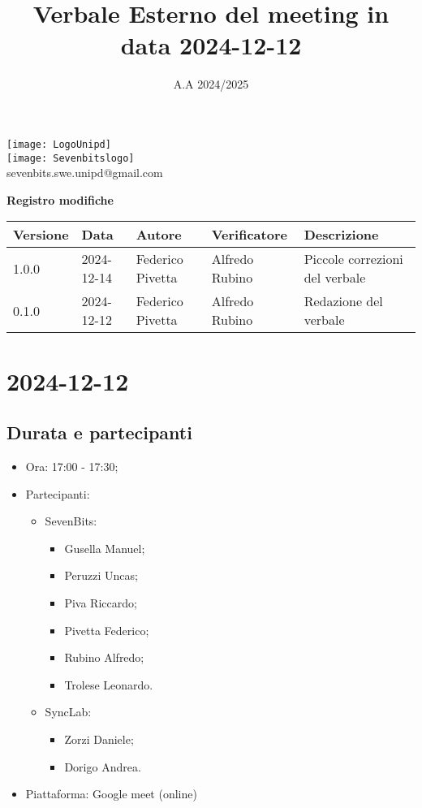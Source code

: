 \documentclass[10pt]{article}
\title{Verbale Esterno del meeting in data 2024-12-12}
\date{A.A 2024/2025}
\begin{document}
\maketitle
\begin{center}
\texttt{[image: LogoUnipd]}\\
\texttt{[image: Sevenbitslogo]}\\
sevenbits.swe.unipd@gmail.com\\
\vspace{2mm}

\textbf{Registro modifiche}\\
\vspace{2mm}
\begin{tabularx}{\textwidth}{|l|l|l|l|X|}
\hline
\textbf{Versione} & \textbf{Data} & \textbf{Autore} & \textbf{Verificatore} & \textbf{Descrizione} \\
\hline
1.0.0 & 2024-12-14 & Federico Pivetta & Alfredo Rubino & Piccole correzioni del verbale\\
\hline
0.1.0 & 2024-12-12 & Federico Pivetta & Alfredo Rubino & Redazione del verbale\\
\hline
\end{tabularx}
\end{center}

\newpage
\tableofcontents

\newpage
\section{2024-12-12}
\subsection{Durata e partecipanti}
\begin{itemize}
\item Ora: 17:00 - 17:30;
\item Partecipanti: 	
	\begin{itemize}
            \item SevenBits:
            \begin{itemize}
	              \item Gusella Manuel;
                    \item Peruzzi Uncas;
                    \item Piva Riccardo;
                    \item Pivetta Federico;
                    \item Rubino Alfredo;
                    \item Trolese Leonardo.
	    \end{itemize}
            \item SyncLab:
            \begin{itemize}
                \item Zorzi Daniele;
                \item Dorigo Andrea.
            \end{itemize}
        \end{itemize}
\item Piattaforma: Google meet (online)
\end{itemize}
\end{document}

